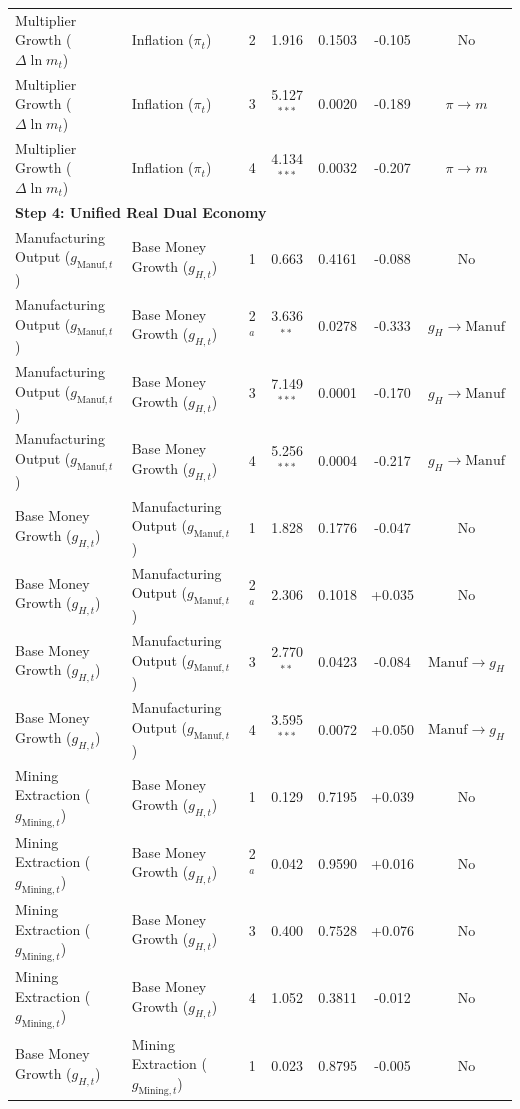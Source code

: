 \begin{table}[p]
{\begin{tabular}{llccccc}
Multiplier Growth ($\Delta \ln m_t$) & Inflation ($\pi_t$) & 2 & 1.916 & 0.1503 & -0.105 & No \\
Multiplier Growth ($\Delta \ln m_t$) & Inflation ($\pi_t$) & 3 & 5.127$^{***}$ & 0.0020 & -0.189 & $\pi \to m$ \\
Multiplier Growth ($\Delta \ln m_t$) & Inflation ($\pi_t$) & 4 & 4.134$^{***}$ & 0.0032 & -0.207 & $\pi \to m$ \\
\multicolumn{7}{l}{\textbf{Step 4: Unified Real Dual Economy}} \\[0.15em]
Manufacturing Output ($g_{\text{Manuf},t}$) & Base Money Growth ($g_{H,t}$) & 1 & 0.663 & 0.4161 & -0.088 & No \\
Manufacturing Output ($g_{\text{Manuf},t}$) & Base Money Growth ($g_{H,t}$) & 2$^a$ & 3.636$^{**}$ & 0.0278 & -0.333 & $g_H \to \text{Manuf}$ \\
Manufacturing Output ($g_{\text{Manuf},t}$) & Base Money Growth ($g_{H,t}$) & 3 & 7.149$^{***}$ & 0.0001 & -0.170 & $g_H \to \text{Manuf}$ \\
Manufacturing Output ($g_{\text{Manuf},t}$) & Base Money Growth ($g_{H,t}$) & 4 & 5.256$^{***}$ & 0.0004 & -0.217 & $g_H \to \text{Manuf}$ \\
Base Money Growth ($g_{H,t}$) & Manufacturing Output ($g_{\text{Manuf},t}$) & 1 & 1.828 & 0.1776 & -0.047 & No \\
Base Money Growth ($g_{H,t}$) & Manufacturing Output ($g_{\text{Manuf},t}$) & 2$^a$ & 2.306 & 0.1018 & +0.035 & No \\
Base Money Growth ($g_{H,t}$) & Manufacturing Output ($g_{\text{Manuf},t}$) & 3 & 2.770$^{**}$ & 0.0423 & -0.084 & $\text{Manuf} \to g_H$ \\
Base Money Growth ($g_{H,t}$) & Manufacturing Output ($g_{\text{Manuf},t}$) & 4 & 3.595$^{***}$ & 0.0072 & +0.050 & $\text{Manuf} \to g_H$ \\
Mining Extraction ($g_{\text{Mining},t}$) & Base Money Growth ($g_{H,t}$) & 1 & 0.129 & 0.7195 & +0.039 & No \\
Mining Extraction ($g_{\text{Mining},t}$) & Base Money Growth ($g_{H,t}$) & 2$^a$ & 0.042 & 0.9590 & +0.016 & No \\
Mining Extraction ($g_{\text{Mining},t}$) & Base Money Growth ($g_{H,t}$) & 3 & 0.400 & 0.7528 & +0.076 & No \\
Mining Extraction ($g_{\text{Mining},t}$) & Base Money Growth ($g_{H,t}$) & 4 & 1.052 & 0.3811 & -0.012 & No \\
Base Money Growth ($g_{H,t}$) & Mining Extraction ($g_{\text{Mining},t}$) & 1 & 0.023 & 0.8795 & -0.005 & No \\

\end{tabular}}
\end{table}
